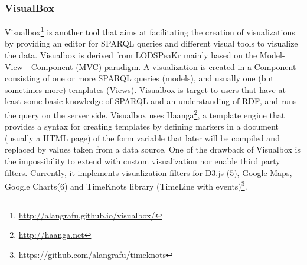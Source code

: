 
\subsubsection{VisualBox}

Visualbox\footnote{\url{http://alangrafu.github.io/visualbox/}} is another tool that aims at facilitating the creation of visualizations by providing an editor for SPARQL queries and different
visual tools to visualize the data. Visualbox is derived from LODSPeaKr \cite{graves13} mainly based on the Model- View - Component (MVC) paradigm. A visualization is created in a Component consisting of one or more SPARQL queries (models), and usually one (but sometimes more) templates (Views).
Visualbox is target to users that have at least some basic knowledge of SPARQL and an understanding of RDF, and runs the query on the server side. Visualbox uses Haanga\footnote{\url{http://haanga.net}}, a template engine that provides a syntax for creating templates by defining markers in a document (usually a HTML page) of the form {{variable}} that later will be compiled and replaced by values taken from a data source. One of the drawback of Visualbox is the impossibility to extend with custom visualization nor enable third party filters.
Currently, it implements visualization filters for D3.js (5), Google Maps, Google Charts(6) and TimeKnots library (TimeLine with events)\footnote{\url{https://github.com/alangrafu/timeknots}}.

